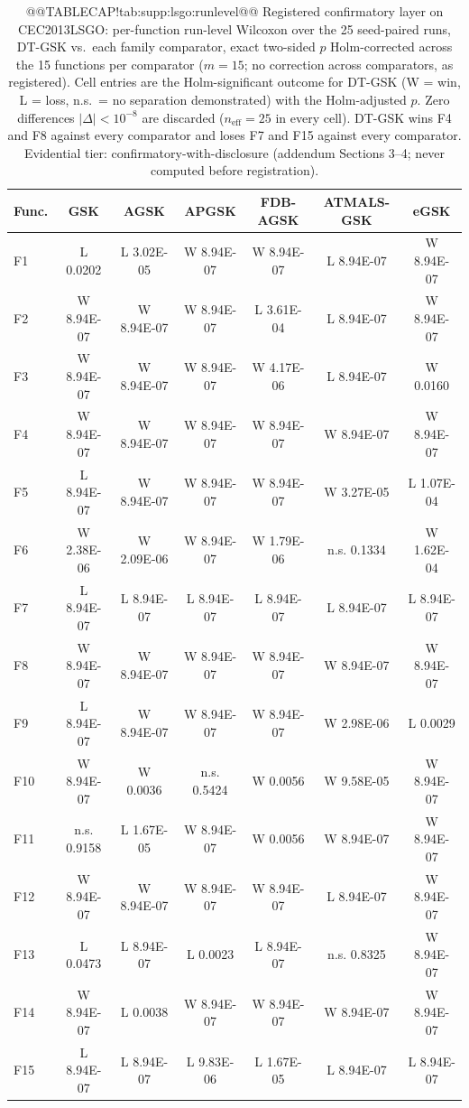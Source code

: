 \documentclass[10pt,a4paper]{article}
\newcommand{\dtgsk}{DT-GSK}
\begin{document}
\begin{table}[p]
\caption{@@TABLECAP!tab:supp:lsgo:runlevel@@ Registered confirmatory layer on CEC2013LSGO: per-function
run-level Wilcoxon over the 25 seed-paired runs, \dtgsk{} vs.\ each
family comparator, exact two-sided $p$ Holm-corrected across the 15
functions per comparator ($m = 15$; no correction across comparators, as
registered).  Cell entries are the Holm-significant outcome for \dtgsk{}
(W = win, L = loss, n.s.\ = no separation demonstrated) with the
Holm-adjusted $p$.  Zero differences $|\Delta| < 10^{-8}$ are discarded
($n_{\mathrm{eff}} = 25$ in every cell).  \dtgsk{} wins F4 and F8
against every comparator and loses F7 and F15 against every comparator.
Evidential tier: confirmatory-with-disclosure (addendum Sections 3--4;
never computed before registration).
}\label{tab:supp:lsgo:runlevel}


\zebra
\begin{tabular}{lcccccc}
\toprule
\textbf{Func.} & \textbf{GSK} & \textbf{AGSK} & \textbf{APGSK} & \textbf{FDB-AGSK} & \textbf{ATMALS-GSK} & \textbf{eGSK} \\
\midrule
F1 & L 0.0202 & L 3.02E-05 & W 8.94E-07 & W 8.94E-07 & L 8.94E-07 & W 8.94E-07 \\
F2 & W 8.94E-07 & W 8.94E-07 & W 8.94E-07 & L 3.61E-04 & L 8.94E-07 & W 8.94E-07 \\
F3 & W 8.94E-07 & W 8.94E-07 & W 8.94E-07 & W 4.17E-06 & L 8.94E-07 & W 0.0160 \\
F4 & W 8.94E-07 & W 8.94E-07 & W 8.94E-07 & W 8.94E-07 & W 8.94E-07 & W 8.94E-07 \\
F5 & L 8.94E-07 & W 8.94E-07 & W 8.94E-07 & W 8.94E-07 & W 3.27E-05 & L 1.07E-04 \\
F6 & W 2.38E-06 & W 2.09E-06 & W 8.94E-07 & W 1.79E-06 & n.s. 0.1334 & W 1.62E-04 \\
F7 & L 8.94E-07 & L 8.94E-07 & L 8.94E-07 & L 8.94E-07 & L 8.94E-07 & L 8.94E-07 \\
F8 & W 8.94E-07 & W 8.94E-07 & W 8.94E-07 & W 8.94E-07 & W 8.94E-07 & W 8.94E-07 \\
F9 & L 8.94E-07 & W 8.94E-07 & W 8.94E-07 & W 8.94E-07 & W 2.98E-06 & L 0.0029 \\
F10 & W 8.94E-07 & W 0.0036 & n.s. 0.5424 & W 0.0056 & W 9.58E-05 & W 8.94E-07 \\
F11 & n.s. 0.9158 & L 1.67E-05 & W 8.94E-07 & W 0.0056 & W 8.94E-07 & W 8.94E-07 \\
F12 & W 8.94E-07 & W 8.94E-07 & W 8.94E-07 & W 8.94E-07 & L 8.94E-07 & W 8.94E-07 \\
F13 & L 0.0473 & L 8.94E-07 & L 0.0023 & L 8.94E-07 & n.s. 0.8325 & W 8.94E-07 \\
F14 & W 8.94E-07 & L 0.0038 & W 8.94E-07 & W 8.94E-07 & W 8.94E-07 & W 8.94E-07 \\
F15 & L 8.94E-07 & L 8.94E-07 & L 9.83E-06 & L 1.67E-05 & L 8.94E-07 & L 8.94E-07 \\
\bottomrule
\end{tabular}
\end{table}
\end{document}
